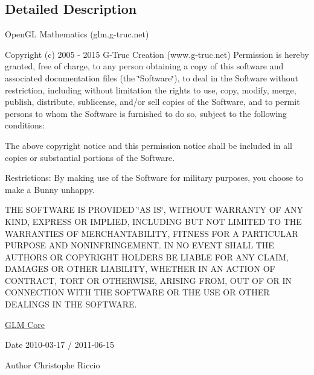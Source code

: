 \subsection{Detailed Description}
Open\-G\-L Mathematics (glm.\-g-\/truc.\-net)

Copyright (c) 2005 -\/ 2015 G-\/\-Truc Creation (www.\-g-\/truc.\-net) Permission is hereby granted, free of charge, to any person obtaining a copy of this software and associated documentation files (the \char`\"{}\-Software\char`\"{}), to deal in the Software without restriction, including without limitation the rights to use, copy, modify, merge, publish, distribute, sublicense, and/or sell copies of the Software, and to permit persons to whom the Software is furnished to do so, subject to the following conditions\-:

The above copyright notice and this permission notice shall be included in all copies or substantial portions of the Software.

Restrictions\-: By making use of the Software for military purposes, you choose to make a Bunny unhappy.

T\-H\-E S\-O\-F\-T\-W\-A\-R\-E I\-S P\-R\-O\-V\-I\-D\-E\-D \char`\"{}\-A\-S I\-S\char`\"{}, W\-I\-T\-H\-O\-U\-T W\-A\-R\-R\-A\-N\-T\-Y O\-F A\-N\-Y K\-I\-N\-D, E\-X\-P\-R\-E\-S\-S O\-R I\-M\-P\-L\-I\-E\-D, I\-N\-C\-L\-U\-D\-I\-N\-G B\-U\-T N\-O\-T L\-I\-M\-I\-T\-E\-D T\-O T\-H\-E W\-A\-R\-R\-A\-N\-T\-I\-E\-S O\-F M\-E\-R\-C\-H\-A\-N\-T\-A\-B\-I\-L\-I\-T\-Y, F\-I\-T\-N\-E\-S\-S F\-O\-R A P\-A\-R\-T\-I\-C\-U\-L\-A\-R P\-U\-R\-P\-O\-S\-E A\-N\-D N\-O\-N\-I\-N\-F\-R\-I\-N\-G\-E\-M\-E\-N\-T. I\-N N\-O E\-V\-E\-N\-T S\-H\-A\-L\-L T\-H\-E A\-U\-T\-H\-O\-R\-S O\-R C\-O\-P\-Y\-R\-I\-G\-H\-T H\-O\-L\-D\-E\-R\-S B\-E L\-I\-A\-B\-L\-E F\-O\-R A\-N\-Y C\-L\-A\-I\-M, D\-A\-M\-A\-G\-E\-S O\-R O\-T\-H\-E\-R L\-I\-A\-B\-I\-L\-I\-T\-Y, W\-H\-E\-T\-H\-E\-R I\-N A\-N A\-C\-T\-I\-O\-N O\-F C\-O\-N\-T\-R\-A\-C\-T, T\-O\-R\-T O\-R O\-T\-H\-E\-R\-W\-I\-S\-E, A\-R\-I\-S\-I\-N\-G F\-R\-O\-M, O\-U\-T O\-F O\-R I\-N C\-O\-N\-N\-E\-C\-T\-I\-O\-N W\-I\-T\-H T\-H\-E S\-O\-F\-T\-W\-A\-R\-E O\-R T\-H\-E U\-S\-E O\-R O\-T\-H\-E\-R D\-E\-A\-L\-I\-N\-G\-S I\-N T\-H\-E S\-O\-F\-T\-W\-A\-R\-E.

\hyperlink{group__core}{G\-L\-M Core}

\begin{DoxyDate}{Date}
2010-\/03-\/17 / 2011-\/06-\/15 
\end{DoxyDate}
\begin{DoxyAuthor}{Author}
Christophe Riccio 
\end{DoxyAuthor}

